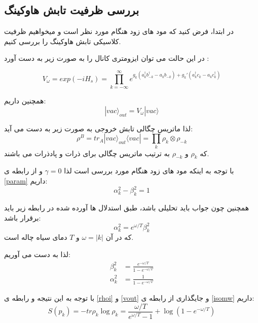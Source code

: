 \subsection{بررسی ظرفیت تابش هاوکینگ}

در ابتدا، فرض کنید که مود های زود هنگام مورد نظر است و میخواهیم ظرفیت کلاسیکی تابش هاوکینگ را بررسی کنیم. 


در این حالت می توان ایزومتری کانال را  به صورت زیر به دست آورد
\cite{cit}
:

\begin{equation} \label{isomw}
V_\omega = exp(-i H_s) = \prod_{k=-\infty}^{\infty} e^{ g_k (a_k^\dagger b_{-k}^\dagger - a_k b_{-k}) +  g_k ' (a_k^\dagger c_k - a_k c_k^\dagger)}
\end{equation}


همچنین داریم:
\begin{equation} \label{vout}
	|vac\rangle_{out} = V_\omega |vac\rangle
\end{equation} 

لذا ماتریس چگالی تابش خروجی به صورت زیر به دست می آید:
\begin{equation} \label{rhoi}
	\rho^B = tr_{A} |vac\rangle_{out} \langle vac | = \prod_k \rho_k \otimes \rho_{-k}
\end{equation}
که 
$\rho_k$
و
$\rho_{-k}$
به ترتیب ماتریس چگالی برای ذرات و پادذرات می باشند.

با توجه به اینکه مود های زود هنگام مورد بررسی است لذا 
$\gamma = 0$
و از
رابطه ی
\ref{param}
داریم:
\begin{equation}
	\alpha_k^2 -\beta_k^2 = 1
\end{equation} 

همچنین چون جواب باید تحلیلی باشد، طبق استدلال ها آورده شده در 
\cite{hr}
رابطه زیر باید برقرار باشد:
\begin{equation}
	\alpha_k ^2= e^{\omega / T} \beta_k ^2
\end{equation} 
 که در آن
 $\omega = |k|$
 و 
 $T$
 دمای سیاه چاله است.
 
لذا به دست می آوریم:
\begin{align}
	\beta_k^2 &= \frac{e^{-\omega / T}}{1- e^{-\omega / T}} \\
	\alpha_k^2 &= \frac{1}{1- e^{-\omega / T}}
\end{align}
 
با توجه به این نتیجه و رابطه ی 
 \ref{rhoi}
 و
 \ref{vout}
 و جایگذاری از رابطه ی
 \ref{isomw}
 داریم:
 \begin{equation}
 	S(p_k) = -tr \rho_k \log \rho_k = \frac{\omega / T}{e^{\omega / T} -1 } + \log (1-e^{-\omega / T})
 \end{equation}
 
